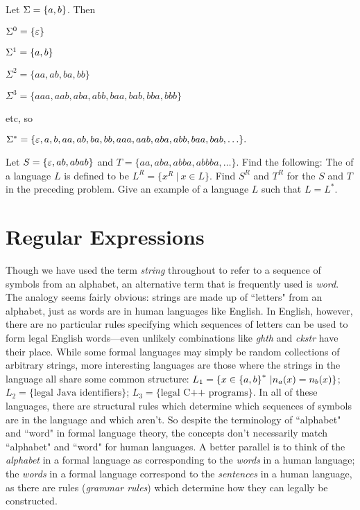 \smallskip

\begin{example}
Let $\Sigma = \mbox{$\{a,b\}$}$.  Then

$\Sigma^0 = \{\varepsilon\}$

$\Sigma^1 = \mbox{$\{a,b\}$}$

$\Sigma^2 = \{aa, ab, ba, bb\}$

$\Sigma^3 = \{aaa, aab, aba, abb, baa, bab, bba, bbb\}$

etc, so

$\Sigma^* =\{\varepsilon,a,b,aa,ab,ba,bb,aaa,aab,aba,abb,baa,bab,\ldots\}.$
\end{example}

\begin{exercises}
\problem Let $S = \{\varepsilon, ab, abab\}$ and $T = \{aa, aba, abba, abbba,
\ldots\}$.  Find the following:
\problem The  of a language $L$ is defined to be 
$L^R = \{ x^R \ | \ x \in L\}$.  Find $S^R$ and $T^R$ for the $S$ and $T$ in the
preceding problem.
\problem Give an example of a language $L$ such that $L=L^*$.

\end{exercises}

\section{Regular Expressions}

Though we have used the term {\em string} throughout to refer to a sequence of
symbols from an alphabet, an alternative term that is frequently used is {\em
word}.  The analogy seems fairly obvious: strings are made up of ``letters"
from an alphabet, just as words are in human languages like English.
In English, however, there are no particular rules specifying which sequences 
of letters can be used to form legal English words---even unlikely
combinations like {\em ghth} and {\em ckstr} have their place.  
While some formal languages may simply
be random collections of arbitrary strings, more interesting languages
are those where the strings in the language all share some 
common structure:  $L_1 = \{ x\in \mbox{$\{a,b\}$}^* \ | n_a(x) =
n_b(x)\}$; $L_2 = \{\mbox{legal Java identifiers}\}$; $L_3 = \{\mbox{legal C++
programs}\}$.  In all of these languages, there are structural 
rules which determine which sequences of symbols are in the language and which
aren't.
So
despite the terminology of ``alphabet" and ``word" in formal
language theory, the concepts don't necessarily match ``alphabet"
and ``word" for human languages.  A better parallel is to think of
the {\em alphabet} in a formal language as corresponding to the {\em words} in a
human language; the {\em words} in a formal language correspond to
the {\em sentences} in a human language, as there are rules ({\em grammar 
rules}) which determine how they can legally be constructed.

